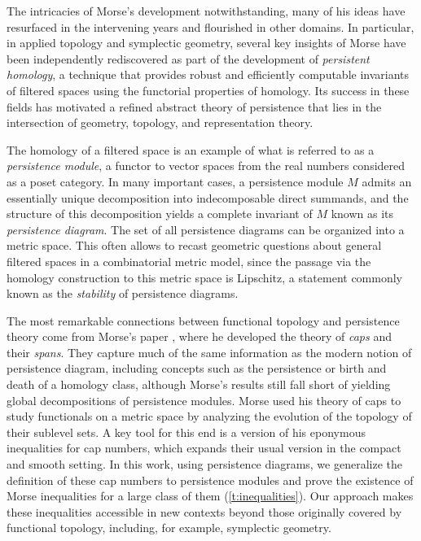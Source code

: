 The intricacies of Morse's development notwithstanding, many of his ideas have resurfaced in the intervening years and flourished in other domains.
In particular, in applied topology and symplectic geometry, several key insights of Morse have been independently rediscovered as part of the development of \emph{persistent homology}, a technique that provides robust and efficiently computable invariants of filtered spaces using the functorial properties of homology.
Its success in these fields has motivated a refined abstract theory of persistence that lies in the intersection of geometry, topology, and representation theory.

The homology of a filtered space is an example of what is referred to as a \emph{persistence module}, a functor to vector spaces from the real numbers considered as a poset category.
In many important cases, a persistence module $M$ admits an essentially unique decomposition into indecomposable direct summands, and the structure of this decomposition yields a complete invariant of $M$ known as its \emph{persistence diagram}.
The set of all persistence diagrams can be organized into a metric space.
This often allows to recast geometric questions about general filtered spaces in a combinatorial metric model, since the passage via the homology construction to this metric space is Lipschitz, a statement commonly known as the \emph{stability} of persistence diagrams.

The most remarkable connections between functional topology and persistence theory come from Morse's paper \cite{Morse.1940}, where he developed the theory of \emph{caps} and their \emph{spans}.
They capture much of the same information as the modern notion of persistence diagram, including concepts such as the persistence or birth and death of a homology class, although Morse's results still fall short of yielding global decompositions of persistence modules.
Morse used his theory of caps to study functionals on a metric space by analyzing the evolution of the topology of their sublevel sets.
A key tool for this end is a version of his eponymous inequalities for cap numbers, which expands their usual version in the compact and smooth setting.
In this work, using persistence diagrams, we generalize the definition of these cap numbers to persistence modules and prove the existence of Morse inequalities for a large class of them (\cref{t:inequalities}).
Our approach makes these inequalities accessible in new contexts beyond those originally covered by functional topology, including, for example, symplectic geometry.

